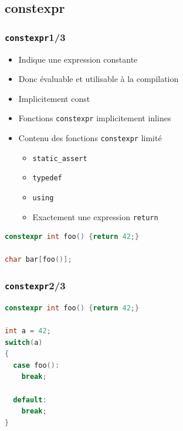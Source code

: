 \documentclass[C++.tex]{subfiles}
\begin{document}
\subsection*{constexpr}
\begin{frame}[fragile]
	\frametitle{\lstinline|constexpr|\titlehfill{}1/3}
	\begin{itemize}
		\item Indique une expression constante
		\item Donc évaluable et utilisable à la compilation
		\item Implicitement const


		\item Fonctions \lstinline|constexpr| implicitement inlines
		\item Contenu des fonctions \lstinline|constexpr| limité
		\begin{itemize}
			\item \lstinline|static_assert|
			\item \lstinline|typedef|
			\item \lstinline|using|
			\item Exactement une expression \lstinline|return|
		\end{itemize}

	\end{itemize}

	\begin{lstlisting}[language=C++]
constexpr int foo() {return 42;}

char bar[foo()];\end{lstlisting}
\end{frame}

\begin{frame}[fragile]
	\frametitle{\lstinline|constexpr|\titlehfill{}2/3}
	\begin{lstlisting}[language=C++]
constexpr int foo() {return 42;}

int a = 42;
switch(a)
{
  case foo():
    break;

  default:
    break;
}\end{lstlisting}
\end{frame}
\end{document}
